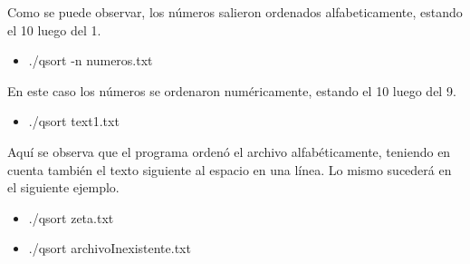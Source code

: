 \documentclass[a4paper,10pt]{article}
\numberwithin{equation}{section}
\numberwithin{figure}{section}
\begin{document}
Como se puede observar, los números salieron ordenados alfabeticamente, estando el 10 luego del 1.

\begin{itemize}
\item  ./qsort -n numeros.txt
\end{itemize}
\noindent{}

En este caso los números se ordenaron numéricamente, estando el 10 luego del 9.

\begin{itemize}
\item  ./qsort text1.txt
\end{itemize}
\noindent{}

Aquí se observa que el programa ordenó el archivo alfabéticamente, teniendo en cuenta también el texto siguiente al espacio en una línea. Lo mismo sucederá en el siguiente ejemplo.

\begin{itemize}
\item  ./qsort zeta.txt
\end{itemize}
\noindent{}


\begin{itemize}
\item  ./qsort archivoInexistente.txt
\end{itemize}
\noindent{}
\end{document}
